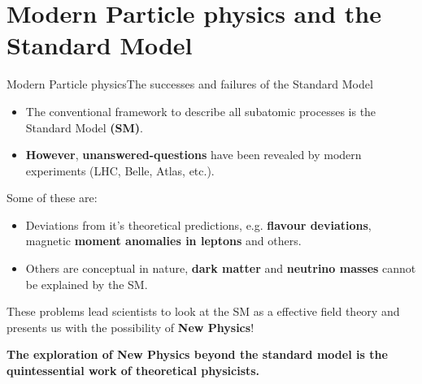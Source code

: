 \documentclass[10pt,xcolor=dvipsnames,mathserif]{beamer}
\newcommand{\blue}[0]{\color{blue}}
\newcommand{\red}[0]{\color{red}}
\begin{document}
\section{Modern Particle physics and the Standard Model} 
    \begin{frame}{Modern Particle physics}{The successes and failures of the Standard Model}
    \begin{itemize}
        \item The conventional framework to describe all subatomic processes is the Standard Model  \textbf{(SM)}. \vskip3mm
        \vskip3mm
        \item  \textbf{However}, {\red \textbf{unanswered-questions}} have been revealed by modern experiments (LHC, Belle, Atlas, etc.). 
    \end{itemize}
    \vskip5mm
    Some of these are:
    \begin{itemize}
        \item Deviations from it's theoretical predictions, e.g. \textbf{flavour deviations}, magnetic \textbf{moment anomalies in leptons} and others. 
        \item Others are conceptual in nature, \textbf{dark matter} and \textbf{neutrino masses} {\blue cannot} be explained by the SM. 
    \end{itemize} 
    \vskip5mm
    \begin{center}
        These problems lead scientists to look at the SM as a effective field theory and presents us with the possibility of \textbf{New Physics}!  
    \end{center}
    \vskip2mm
    \begin{center}
    \textbf{The exploration of New Physics beyond the standard model is the quintessential work of theoretical physicists. } %
    \end{center}
    \end{frame}
\end{document}
